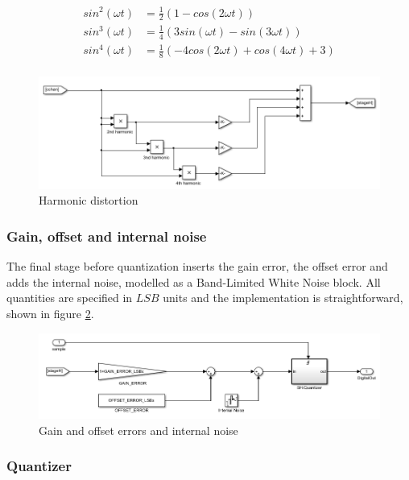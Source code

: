 \documentclass[conference]{IEEEtran}
\begin{document}
\begin{equation}
\begin{split}
sin^2(\omega t) &= \frac{1}{2}(1 - cos(2\omega t)) \\
sin^3(\omega t) &= \frac{1}{4}(3sin(\omega t) - sin(3\omega t)) \\
sin^4(\omega t) &= \frac{1}{8}(-4cos(2\omega t) + cos(4\omega t) + 3) \\
\end{split}
\label{eq:harmonix}
\end{equation}

\begin{figure}[h!]
\centering
\includegraphics[scale=0.25]{pics/models/harmonix.png}
\caption{Harmonic distortion}
\label{fig:harmonixf}
\end{figure}

\subsubsection{Gain, offset and internal noise}

The final stage before quantization inserts the gain error, the offset error and adds the internal noise, modelled as a Band-Limited White Noise block. All quantities are specified in $LSB$ units and the implementation is straightforward, shown in figure \ref{fig:gainoffnoise}. 

\begin{figure}[h!]
\centering
\includegraphics[scale=0.27]{pics/models/gain_off_noise.png}
\caption{Gain and offset errors and internal noise}
\label{fig:gainoffnoise}
\end{figure}

\subsubsection{Quantizer}
\end{document}
